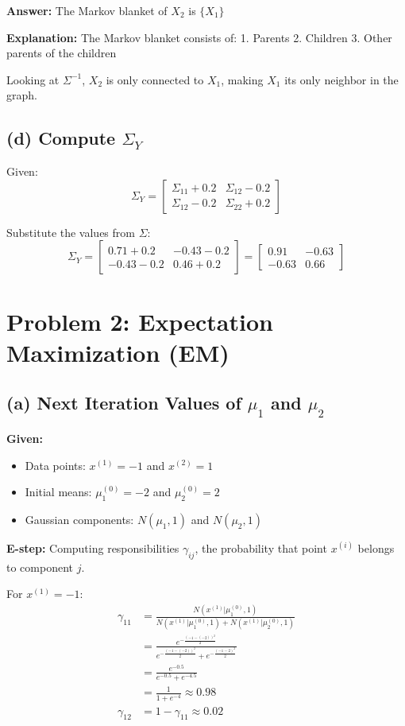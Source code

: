 \documentclass{article}
\begin{document}
\textbf{Answer:} The Markov blanket of $X_2$ is $\{X_1\}$

\textbf{Explanation:}
The Markov blanket consists of:
1. Parents
2. Children
3. Other parents of the children

Looking at $\Sigma^{-1}$, $X_2$ is only connected to $X_1$, making $X_1$ its only neighbor in the graph.

\subsection*{(d) Compute $\Sigma_Y$}

Given:
$$\Sigma_Y = \begin{bmatrix}
\Sigma_{11} + 0.2 & \Sigma_{12} - 0.2 \\
\Sigma_{12} - 0.2 & \Sigma_{22} + 0.2
\end{bmatrix}$$

Substitute the values from $\Sigma$:
$$\Sigma_Y = \begin{bmatrix}
0.71 + 0.2 & -0.43 - 0.2 \\
-0.43 - 0.2 & 0.46 + 0.2
\end{bmatrix} = \begin{bmatrix}
0.91 & -0.63 \\
-0.63 & 0.66
\end{bmatrix}$$

\section*{Problem 2: Expectation Maximization (EM)}

\subsection*{(a) Next Iteration Values of $\mu_1$ and $\mu_2$}

\textbf{Given:}
\begin{itemize}
    \item Data points: $x^{(1)} = -1$ and $x^{(2)} = 1$
    \item Initial means: $\mu_1^{(0)} = -2$ and $\mu_2^{(0)} = 2$
    \item Gaussian components: $N(\mu_1, 1)$ and $N(\mu_2, 1)$
\end{itemize}

\textbf{E-step:} Computing responsibilities $\gamma_{ij}$, the probability that point $x^{(i)}$ belongs to component $j$.

For $x^{(1)} = -1$:
\begin{align*}
\gamma_{11} &= \frac{N(x^{(1)} | \mu_1^{(0)}, 1)}{N(x^{(1)} | \mu_1^{(0)}, 1) + N(x^{(1)} | \mu_2^{(0)}, 1)} \\
&= \frac{e^{-\frac{(-1 - (-2))^2}{2}}}{e^{-\frac{(-1 - (-2))^2}{2}} + e^{-\frac{(-1 - 2)^2}{2}}} \\
&= \frac{e^{-0.5}}{e^{-0.5} + e^{-4.5}} \\
&= \frac{1}{1 + e^{-4}} \approx 0.98 \\
\gamma_{12} &= 1 - \gamma_{11} \approx 0.02
\end{align*}
\end{document}

